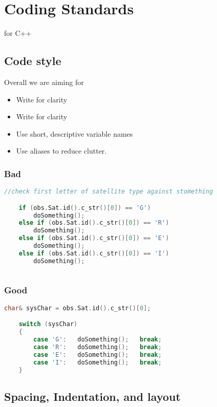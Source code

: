 \chapter{Coding Standards}
\label{ch:coding_standards}

 for C++

\section{Code style}
Overall we are aiming for
\begin{itemize}
	\item  Write for clarity
	\item  Write for clarity
	\item  Use short, descriptive variable names
	\item  Use aliases to reduce clutter.
\end{itemize}

\subsection{Bad}
\begin{lstlisting}[language=C++]
    //check first letter of satellite type against stomething

    if (obs.Sat.id().c_str()[0]) == 'G') 
        doSomething(); 
    else if (obs.Sat.id().c_str()[0]) == 'R')
        doSomething();
    else if (obs.Sat.id().c_str()[0]) == 'E')
        doSomething();
    else if (obs.Sat.id().c_str()[0]) == 'I')
        doSomething();
        
\end{lstlisting}

\subsection{Good}

\begin{lstlisting}[language=c++]
    char& sysChar = obs.Sat.id().c_str()[0];

    switch (sysChar)
    {
        case 'G':   doSomething();   break;
        case 'R':   doSomething();   break;
        case 'E':   doSomething();   break;
        case 'I':   doSomething();   break;
    }
\end{lstlisting}


\section{Spacing, Indentation, and layout}

